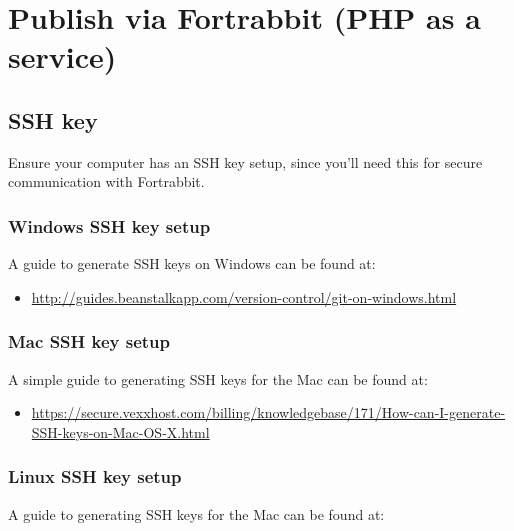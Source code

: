 \documentclass[a4paperpaper,openright]{book}
\providecommand{\tightlist}{%
  \setlength{\itemsep}{0pt}\setlength{\parskip}{0pt}}
\begin{document}
\hypertarget{publish-via-fortrabbit-php-as-a-service}{%
\chapter{\texorpdfstring{Publish via Fortrabbit (PHP as a
service)\label{appendix_fortrabbit}}{Publish via Fortrabbit (PHP as a service)}}\label{publish-via-fortrabbit-php-as-a-service}}

\hypertarget{ssh-key}{%
\section{SSH key}\label{ssh-key}}

Ensure your computer has an SSH key setup, since you'll need this for
secure communication with Fortrabbit.

\hypertarget{windows-ssh-key-setup}{%
\subsection{Windows SSH key setup}\label{windows-ssh-key-setup}}

A guide to generate SSH keys on Windows can be found at:

\begin{itemize}
\tightlist
\item
  \url{http://guides.beanstalkapp.com/version-control/git-on-windows.html}
\end{itemize}

\hypertarget{mac-ssh-key-setup}{%
\subsection{Mac SSH key setup}\label{mac-ssh-key-setup}}

A simple guide to generating SSH keys for the Mac can be found at:

\begin{itemize}
\tightlist
\item
  \url{https://secure.vexxhost.com/billing/knowledgebase/171/How-can-I-generate-SSH-keys-on-Mac-OS-X.html}
\end{itemize}

\hypertarget{linux-ssh-key-setup}{%
\subsection{Linux SSH key setup}\label{linux-ssh-key-setup}}

A guide to generating SSH keys for the Mac can be found at:
\end{document}
